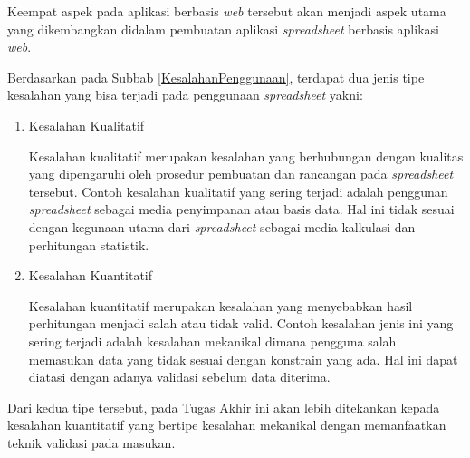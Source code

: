 Keempat aspek pada aplikasi berbasis \textit{web} tersebut akan menjadi aspek utama yang dikembangkan didalam pembuatan aplikasi \textit{spreadsheet} berbasis aplikasi \textit{web}.

Berdasarkan pada Subbab \ref{KesalahanPenggunaan}, terdapat dua jenis tipe kesalahan yang bisa terjadi pada penggunaan \textit{spreadsheet} yakni:
\begin{enumerate}
	\item Kesalahan Kualitatif

	Kesalahan kualitatif merupakan kesalahan yang berhubungan dengan kualitas yang dipengaruhi oleh prosedur pembuatan dan rancangan pada \textit{spreadsheet} tersebut. Contoh kesalahan kualitatif yang sering terjadi adalah penggunan \textit{spreadsheet} sebagai media penyimpanan atau basis data. Hal ini tidak sesuai dengan kegunaan utama dari \textit{spreadsheet} sebagai media kalkulasi dan perhitungan statistik.

	\item Kesalahan Kuantitatif

	Kesalahan kuantitatif merupakan kesalahan yang menyebabkan hasil perhitungan menjadi salah atau tidak valid. Contoh kesalahan jenis ini yang sering terjadi adalah kesalahan mekanikal dimana pengguna salah memasukan data yang tidak sesuai dengan konstrain yang ada. Hal ini dapat diatasi dengan adanya validasi sebelum data diterima. 
\end{enumerate}

Dari kedua tipe tersebut, pada Tugas Akhir ini akan lebih ditekankan kepada kesalahan kuantitatif yang bertipe kesalahan mekanikal dengan memanfaatkan teknik validasi pada masukan.

